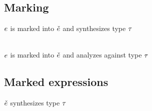 \documentclass[formalism.tex]{subfiles}
\begin{document}
\subsection{Marking}
\label{sec:patterned-marking}
\judgbox{\ctxSynFixedInto{\ctx}{\EMV}{\ECMV}{\TMV}} $\EMV$ is marked into $\ECMV$ and synthesizes type $\TMV$
%
\begin{mathpar}
\end{mathpar} \\

\judgbox{\ctxAnaFixedInto{\ctx}{\EMV}{\ECMV}{\TMV}} $\EMV$ is marked into $\ECMV$ and analyzes against type $\TMV$
%
\begin{mathpar}
\end{mathpar}

\subsection{Marked expressions}
\label{sec:patterned-marked-expressions}
\judgbox{\ctxSynTypeM{\ctx}{\ECMV}{\TMV}} $\ECMV$ synthesizes type $\TMV$
%
\begin{mathpar}
\end{mathpar}
\end{document}
